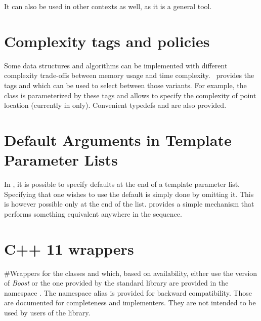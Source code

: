 It can also be used in other contexts as well, as it is a general tool.

\section{Complexity tags and policies}

Some data structures and algorithms can be implemented with different
complexity trade-offs between memory usage and time complexity. \cgal\ provides
the tags  and  which can be used to select between those
variants.  For example, the  class is parameterized by
these tags and allows to specify the complexity of point location (currently in
 only).  Convenient typedefs 
and  are also provided.

\section{Default Arguments in Template Parameter Lists}

In \CC, it is possible to specify defaults at the end of a template parameter
list.  Specifying that one wishes to use the default is simply done by omitting
it.  This is however possible only at the end of the list.  
provides a simple mechanism that performs something equivalent anywhere in the
sequence.

\section{C++ 11 wrappers}

#Wrappers for the classes  and  which, based on
availability, either use the version of {\em Boost} or the one
provided by the standard library are provided in the namespace
. The namespace alias  is provided
for backward compatibility. Those are documented for completeness and
implementers. They are not intended to be used by users of the
library.
